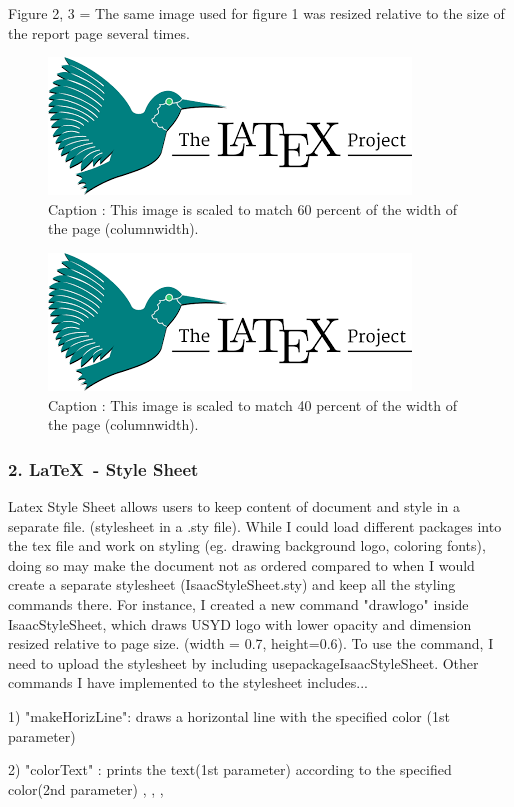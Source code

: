 \documentclass[a4paper, 11pt]{report}
\begin{document}
Figure 2, 3 = The same image used for figure 1 was resized relative to the size of the report page several times.
\begin{figure}[h]
\centering
\includegraphics[width=0.6\columnwidth]{latexLogo.png}
\caption{Caption : This image is scaled to match 60 percent of the width of the page (columnwidth).}
\label{fig}
\end{figure}
\begin{figure}[h]
\centering
\includegraphics[width=0.4\columnwidth]{latexLogo.png}
\caption{Caption : This image is scaled to match 40 percent of the width of the page (columnwidth).}
\label{fig}
\end{figure}

\subsubsection{2. \LaTeX\ - Style Sheet}
Latex Style Sheet allows users to keep content of document and style in a separate file. (stylesheet in a .sty file). While I could load different packages into the tex file and work on styling (eg. drawing background logo, coloring fonts), doing so may make the document not as ordered compared to when I would create a separate stylesheet (IsaacStyleSheet.sty) and keep all the styling commands there. For instance, I created a new command "drawlogo" inside IsaacStyleSheet, which draws USYD logo with lower opacity and dimension resized relative to page size. (width = 0.7, height=0.6). To use the command, I need to upload the stylesheet by including usepackage{IsaacStyleSheet}. Other commands I have implemented to the stylesheet includes... 

1) "makeHorizLine": draws a horizontal line with the specified color (1st parameter)

2) "colorText" : prints the text(1st parameter) according to the specified color(2nd parameter)
, , , 
\end{document}
